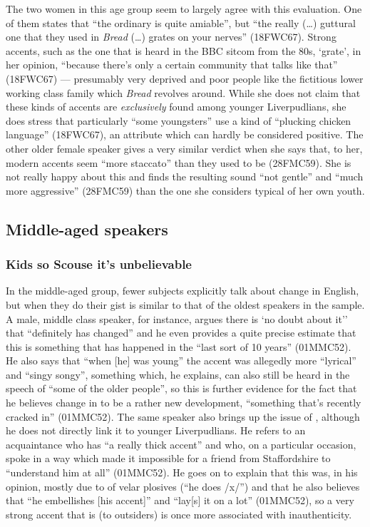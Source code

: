 The two women in this age group seem to largely agree with this evaluation.
One of them states that ``the ordinary  is quite amiable'', but ``the really (\ldots) guttural one that they used in \emph{Bread} (\ldots) grates on your nerves'' (18FWC67).
Strong accents, such as the one that is heard in the BBC sitcom from the 80s, `grate', in her opinion, ``because there's only a certain community that talks like that'' (18FWC67) --- presumably very deprived and poor people like the fictitious lower working class family which \emph{Bread} revolves around.
While she does not claim that these kinds of accents are \emph{exclusively} found among younger Liverpudlians, she does stress that particularly ``some youngsters'' use a kind of ``plucking chicken language'' (18FWC67), an attribute which can hardly be considered positive.
The other older female speaker gives a very similar verdict when she says that, to her, modern  accents seem ``more staccato'' than they used to be (28FMC59).
She is not really happy about this and finds the resulting sound ``not gentle'' and ``much more aggressive'' (28FMC59) than the one she considers typical of her own youth.

\subsection{Middle-aged speakers}
\label{aware_res.eval.mid}

\subsubsection{Kids so Scouse it's unbelievable}
\label{aware_res.eval.mid.change}

In the middle-aged group, fewer subjects explicitly talk about change in  English, but when they do their gist is similar to that of the oldest speakers in the sample.
A male, middle class speaker, for instance, argues there is `no doubt about it'' that  ``definitely has changed'' and he even provides a quite precise estimate that this is something that has happened in the ``last sort of 10 years'' (01MMC52).
He also says that ``when [he] was young'' the accent was allegedly more ``lyrical'' and ``singy songy'', something which, he explains, can also still be heard in the speech of ``some of the older people'', so this is further evidence for the fact that he believes change in  to be a rather new development, ``something that's recently cracked in'' (01MMC52).
The same speaker also brings up the issue of , although he does not directly link it to younger Liverpudlians.
He refers to an acquaintance who has ``a really thick accent'' and who, on a particular occasion, spoke in a way which made it impossible for a friend from Staffordshire to ``understand him at all'' (01MMC52).
He goes on to explain that this was, in his opinion, mostly due to  of velar plosives (``he does /x/'') and that he also believes that ``he embellishes [his accent]'' and ``lay[s] it on a lot'' (01MMC52), so a very strong accent that is  (to outsiders) is once more associated with inauthenticity.

